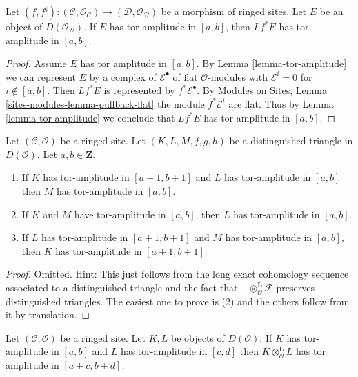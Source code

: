 \begin{lemma}
\label{lemma-tor-amplitude-pullback}
Let $(f, f^\sharp) : (\mathcal{C}, \mathcal{O}_\mathcal{C}) \to
(\mathcal{D}, \mathcal{O}_\mathcal{D})$
be a morphism of ringed sites.
Let $E$ be an object of $D(\mathcal{O}_\mathcal{D})$.
If $E$ has tor amplitude in $[a, b]$,
then $Lf^*E$ has tor amplitude in $[a, b]$.
\end{lemma}

\begin{proof}
Assume $E$ has tor amplitude in $[a, b]$. By
Lemma \ref{lemma-tor-amplitude}
we can represent $E$ by a complex of
$\mathcal{E}^\bullet$ of flat $\mathcal{O}$-modules with
$\mathcal{E}^i = 0$ for $i \not \in [a, b]$. Then
$Lf^*E$ is represented by $f^*\mathcal{E}^\bullet$.
By Modules on Sites, Lemma \ref{sites-modules-lemma-pullback-flat}
the module $f^*\mathcal{E}^i$ are flat.
Thus by Lemma \ref{lemma-tor-amplitude}
we conclude that $Lf^*E$ has tor amplitude in $[a, b]$.
\end{proof}

\begin{lemma}
\label{lemma-cone-tor-amplitude}
Let $(\mathcal{C}, \mathcal{O})$ be a ringed site.
Let $(K, L, M, f, g, h)$ be a distinguished
triangle in $D(\mathcal{O})$. Let $a, b \in \mathbf{Z}$.
\begin{enumerate}
\item If $K$ has tor-amplitude in $[a + 1, b + 1]$ and
$L$ has tor-amplitude in $[a, b]$ then $M$ has
tor-amplitude in $[a, b]$.
\item If $K$ and $M$ have tor-amplitude in $[a, b]$, then
$L$ has tor-amplitude in $[a, b]$.
\item If $L$ has tor-amplitude in $[a + 1, b + 1]$
and $M$ has tor-amplitude in $[a, b]$, then
$K$ has tor-amplitude in $[a + 1, b + 1]$.
\end{enumerate}
\end{lemma}

\begin{proof}
Omitted. Hint: This just follows from the long exact cohomology sequence
associated to a distinguished triangle and the fact that
$- \otimes_\mathcal{O}^{\mathbf{L}} \mathcal{F}$
preserves distinguished triangles.
The easiest one to prove is (2) and the others follow from it by
translation.
\end{proof}

\begin{lemma}
\label{lemma-tensor-tor-amplitude}
Let $(\mathcal{C}, \mathcal{O})$ be a ringed site. Let $K, L$ be objects of
$D(\mathcal{O})$. If $K$ has tor-amplitude in $[a, b]$ and
$L$ has tor-amplitude in $[c, d]$ then $K \otimes_\mathcal{O}^\mathbf{L} L$
has tor amplitude in $[a + c, b + d]$.
\end{lemma}

